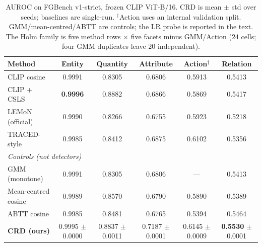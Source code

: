 \begin{table}[t]
\centering
\footnotesize
\setlength{\tabcolsep}{9pt}
\caption{AUROC on FGBench v1-strict, frozen CLIP ViT-B/16. CRD is mean $\pm$ std over
seeds; baselines are single-run. $^\dagger$Action uses an internal validation split.
GMM/mean-centred/ABTT are controls; the LR probe is reported in the text. The Holm
family is five method rows $\times$ five facets minus GMM/Action ($24$ cells; four
GMM duplicates leave $20$ independent).}
\label{tab:main}
\begin{tabular}{lccccc}
\toprule
Method & Entity & Quantity & Attribute & Action$^\dagger$ & Relation \\
\midrule
CLIP cosine                & 0.9991 & 0.8305 & 0.6806 & 0.5913 & 0.5413 \\
CLIP + CSLS                & \textbf{0.9996} & 0.8882 & 0.6866 & 0.5869 & 0.5417 \\
LEMoN (official)           & 0.9990 & 0.8266 & 0.6755 & 0.5923 & 0.5218 \\
TRACED-style               & 0.9985 & 0.8412 & 0.6875 & 0.6102 & 0.5356 \\
\midrule
\multicolumn{6}{l}{\emph{Controls (not detectors)}}\\
GMM (monotone)             & 0.9991 & 0.8305 & 0.6806 & --- & 0.5413 \\
Mean-centred cosine        & 0.9989 & 0.8570 & 0.6790 & 0.5890 & 0.5389 \\
ABTT cosine                & 0.9985 & 0.8481 & 0.6765 & 0.5394 & 0.5464 \\
\midrule
\textbf{CRD (ours)}        & \shortstack{0.9995\\\scriptsize$\pm$0.0000} & \shortstack{0.8837\\\scriptsize$\pm$0.0011} & \shortstack{0.7187\\\scriptsize$\pm$0.0001} & \shortstack{0.6145\\\scriptsize$\pm$0.0009} & \shortstack{\textbf{0.5530}\\\scriptsize$\pm$0.0001} \\
\bottomrule
\end{tabular}
\end{table}

